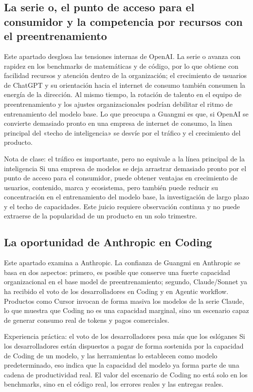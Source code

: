 \documentclass[a4paper]{article}
\begin{document}
\subsection{La serie o, el punto de acceso para el consumidor y la competencia por recursos con el preentrenamiento}

Este apartado desglosa las tensiones internas de OpenAI. La serie o avanza con rapidez en los benchmarks de matemáticas y de código, por lo que obtiene con facilidad recursos y atención dentro de la organización; el crecimiento de usuarios de ChatGPT y su orientación hacia el internet de consumo también consumen la energía de la dirección. Al mismo tiempo, la rotación de talento en el equipo de preentrenamiento y los ajustes organizacionales podrían debilitar el ritmo de entrenamiento del modelo base. Lo que preocupa a Guangmi es que, si OpenAI se convierte demasiado pronto en una empresa de internet de consumo, la línea principal del «techo de inteligencia» se desvíe por el tráfico y el crecimiento del producto.

\begin{warningbox}{Nota de clase: el tráfico es importante, pero no equivale a la línea principal de la inteligencia}
Si una empresa de modelos se deja arrastrar demasiado pronto por el punto de acceso para el consumidor, puede obtener ventajas en crecimiento de usuarios, contenido, marca y ecosistema, pero también puede reducir su concentración en el entrenamiento del modelo base, la investigación de largo plazo y el techo de capacidades. Este juicio requiere observación continua y no puede extraerse de la popularidad de un producto en un solo trimestre.
\end{warningbox}

\subsection{La oportunidad de Anthropic en Coding}

Este apartado examina a Anthropic. La confianza de Guangmi en Anthropic se basa en dos aspectos: primero, es posible que conserve una fuerte capacidad organizacional en el base model de preentrenamiento; segundo, Claude/Sonnet ya ha recibido el voto de los desarrolladores en Coding y en Agentic workflow. Productos como Cursor invocan de forma masiva los modelos de la serie Claude, lo que muestra que Coding no es una capacidad marginal, sino un escenario capaz de generar consumo real de tokens y pagos comerciales.

\begin{importantbox}{Experiencia práctica: el voto de los desarrolladores pesa más que los eslóganes}
Si los desarrolladores están dispuestos a pagar de forma sostenida por la capacidad de Coding de un modelo, y las herramientas lo establecen como modelo predeterminado, eso indica que la capacidad del modelo ya forma parte de una cadena de productividad real. El valor del escenario de Coding no está solo en los benchmarks, sino en el código real, los errores reales y las entregas reales.
\end{importantbox}
\end{document}
